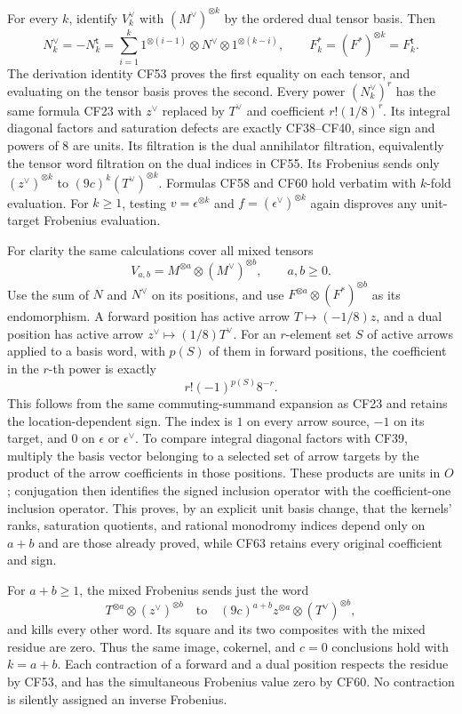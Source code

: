 For every \(k\), identify \(V_k^\vee\) with \((M^\vee)^{\otimes k}\) by the ordered dual tensor basis. Then
\[
 N_k^\vee=-N_k^{\mathsf t}
 =\sum_{i=1}^k1^{\otimes(i-1)}\otimes N^\vee\otimes1^{\otimes(k-i)},
 \qquad F_k^*=(F^*)^{\otimes k}=F_k^{\mathsf t}.
 \tag{CF61}
\]
The derivation identity CF53 proves the first equality on each tensor, and evaluating on the tensor basis proves the second. Every power \((N_k^\vee)^r\) has the same formula CF23 with \(z^\vee\) replaced by \(T^\vee\) and coefficient \(r!(1/8)^r\). Its integral diagonal factors and saturation defects are exactly CF38--CF40, since sign and powers of \(8\) are units. Its filtration is the dual annihilator filtration, equivalently the tensor word filtration on the dual indices in CF55. Its Frobenius sends only \((z^\vee)^{\otimes k}\) to \((9c)^k(T^\vee)^{\otimes k}\). Formulas CF58 and CF60 hold verbatim with \(k\)-fold evaluation. For \(k\geq1\), testing \(v=\epsilon^{\otimes k}\) and \(f=(\epsilon^\vee)^{\otimes k}\) again disproves any unit-target Frobenius evaluation.

For clarity the same calculations cover all mixed tensors
\[
 V_{a,b}=M^{\otimes a}\otimes(M^\vee)^{\otimes b},
 \qquad a,b\geq0.
 \tag{CF62}
\]
Use the sum of \(N\) and \(N^\vee\) on its positions, and use \(F^{\otimes a}\otimes(F^*)^{\otimes b}\) as its endomorphism. A forward position has active arrow \(T\mapsto(-1/8)z\), and a dual position has active arrow \(z^\vee\mapsto(1/8)T^\vee\). For an \(r\)-element set \(S\) of active arrows applied to a basis word, with \(p(S)\) of them in forward positions, the coefficient in the \(r\)-th power is exactly
\[
 r!(-1)^{p(S)}8^{-r}.
 \tag{CF63}
\]
This follows from the same commuting-summand expansion as CF23 and retains the location-dependent sign. The index is \(1\) on every arrow source, \(-1\) on its target, and \(0\) on \(\epsilon\) or \(\epsilon^\vee\). To compare integral diagonal factors with CF39, multiply the basis vector belonging to a selected set of arrow targets by the product of the arrow coefficients in those positions. These products are units in \(O\); conjugation then identifies the signed inclusion operator with the coefficient-one inclusion operator. This proves, by an explicit unit basis change, that the kernels' ranks, saturation quotients, and rational monodromy indices depend only on \(a+b\) and are those already proved, while CF63 retains every original coefficient and sign.

For \(a+b\geq1\), the mixed Frobenius sends just the word
\[
 T^{\otimes a}\otimes(z^\vee)^{\otimes b}
 \quad\text{to}\quad
 (9c)^{a+b}z^{\otimes a}\otimes(T^\vee)^{\otimes b},
 \tag{CF64}
\]
and kills every other word. Its square and its two composites with the mixed residue are zero. Thus the same image, cokernel, and \(c=0\) conclusions hold with \(k=a+b\). Each contraction of a forward and a dual position respects the residue by CF53, and has the simultaneous Frobenius value zero by CF60. No contraction is silently assigned an inverse Frobenius.

